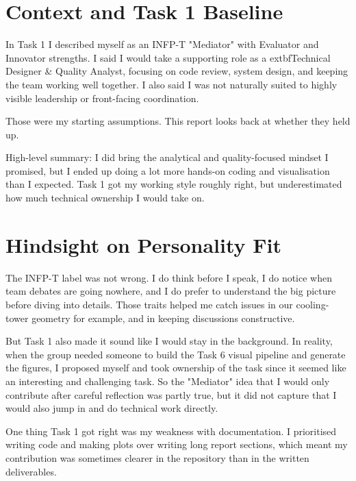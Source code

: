 
\chapter{Context and Task 1 Baseline}


\noindent In Task 1 I described myself as an INFP-T "Mediator" with Evaluator and Innovator strengths. I said I would take a supporting role as a 	extbf{Technical Designer \& Quality Analyst}, focusing on code review, system design, and keeping the team working well together. I also said I was not naturally suited to highly visible leadership or front-facing coordination.


\noindent Those were my starting assumptions. This report looks back at whether they held up.


\noindent High-level summary: I did bring the analytical and quality-focused mindset I promised, but I ended up doing a lot more hands-on coding and visualisation than I expected. Task 1 got my working style roughly right, but underestimated how much technical ownership I would take on.


\chapter{Hindsight on Personality Fit}


\noindent The INFP-T label was not wrong. I do think before I speak, I do notice when team debates are going nowhere, and I do prefer to understand the big picture before diving into details. Those traits helped me catch issues in our cooling-tower geometry for example, and in keeping discussions constructive.


\noindent But Task 1 also made it sound like I would stay in the background. In reality, when the group needed someone to build the Task 6 visual pipeline and generate the figures, I proposed myself and took ownership of the task since it seemed like an interesting and challenging task. So the "Mediator" idea that I would only contribute after careful reflection was partly true, but it did not capture that I would also jump in and do technical work directly.


\noindent One thing Task 1 got right was my weakness with documentation. I prioritised writing code and making plots over writing long report sections, which meant my contribution was sometimes clearer in the repository than in the written deliverables.


